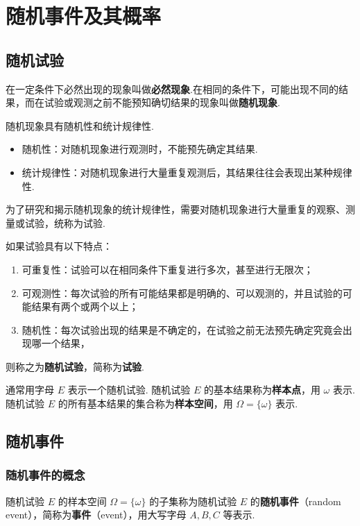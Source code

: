 \chapter{随机事件及其概率}

\section{随机试验}

在一定条件下必然出现的现象叫做\textbf{必然现象}.在相同的条件下，可能出现不同的结果，而在试验或观测之前不能预知确切结果的现象叫做\textbf{随机现象}.

随机现象具有随机性和统计规律性.

\begin{itemize}
    \item 随机性：对随机现象进行观测时，不能预先确定其结果.
    \item 统计规律性：对随机现象进行大量重复观测后，其结果往往会表现出某种规律性.
\end{itemize}

为了研究和揭示随机现象的统计规律性，需要对随机现象进行大量重复的观察、测量或试验，统称为试验.

如果试验具有以下特点：
\begin{enumerate}
    \item 可重复性：试验可以在相同条件下重复进行多次，甚至进行无限次；
    \item 可观测性：每次试验的所有可能结果都是明确的、可以观测的，并且试验的可能结果有两个或两个以上；
    \item 随机性：每次试验出现的结果是不确定的，在试验之前无法预先确定究竟会出现哪一个结果，
\end{enumerate}
则称之为\textbf{随机试验}，简称为\textbf{试验}.

通常用字母 $E$ 表示一个随机试验. 随机试验 $E$ 的基本结果称为\textbf{样本点}，用 $\omega$ 表示.随机试验 $E$ 的所有基本结果的集合称为\textbf{样本空间}，用 $\varOmega = \{ \omega \}$ 表示.

\section{随机事件}

\subsection{随机事件的概念}

随机试验 $E$ 的样本空间 $\varOmega = \{ \omega \}$ 的子集称为随机试验 $E$ 的\textbf{随机事件}（random event），简称为\textbf{事件}（event），用大写字母 $A,B,C$ 等表示.

